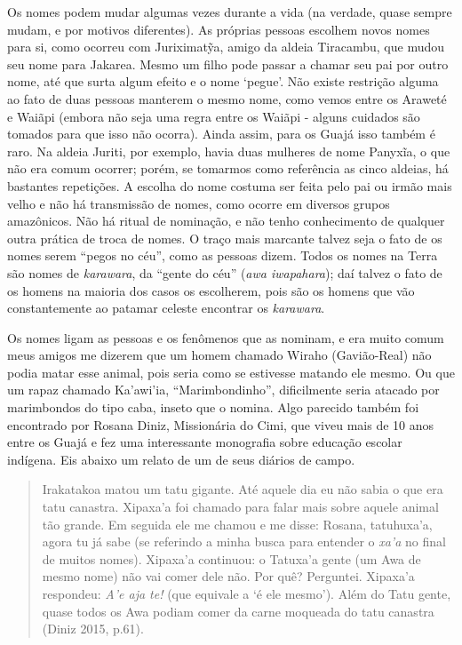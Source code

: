 Os nomes podem mudar algumas vezes durante a vida (na verdade, quase
sempre mudam, e por motivos diferentes). As próprias pessoas escolhem
novos nomes para si, como ocorreu com Juriximatỹa, amigo da aldeia
Tiracambu, que mudou seu nome para Jakarea. Mesmo um filho pode passar a
chamar seu pai por outro nome, até que surta algum efeito e o nome
`pegue'. Não existe restrição alguma ao fato de duas pessoas manterem o
mesmo nome, como vemos entre os Araweté e Waiãpi (embora não seja uma
regra entre os Waiãpi - alguns cuidados são tomados para que isso não
ocorra). Ainda assim, para os Guajá isso também é raro. Na aldeia
Juriti, por exemplo, havia duas mulheres de nome Panyxĩa, o que não era
comum ocorrer; porém, se tomarmos como referência as cinco aldeias, há
bastantes repetições. A escolha do nome costuma ser feita pelo pai ou
irmão mais velho e não há transmissão de nomes, como ocorre em diversos
grupos amazônicos. Não há ritual de nominação, e não tenho conhecimento
de qualquer outra prática de troca de nomes. O traço mais marcante
talvez seja o fato de os nomes serem ``pegos no céu'', como as pessoas
dizem. Todos os nomes na Terra são nomes de \emph{karawara}, da ``gente
do céu'' (\emph{awa iwapahara}); daí talvez o fato de os homens na
maioria dos casos os escolherem, pois são os homens que vão
constantemente ao patamar celeste encontrar os \emph{karawara}.

Os nomes ligam as pessoas e os fenômenos que as nominam, e era muito
comum meus amigos me dizerem que um homem chamado Wiraho (Gavião-Real)
não podia matar esse animal, pois seria como se estivesse matando ele
mesmo. Ou que um rapaz chamado Ka'awi'ia, ``Marimbondinho'',
dificilmente seria atacado por marimbondos do tipo caba, inseto que o
nomina. Algo parecido também foi encontrado por Rosana Diniz,
Missionária do Cimi, que viveu mais de 10 anos entre os Guajá e fez uma
interessante monografia sobre educação escolar indígena. Eis abaixo um
relato de um de seus diários de campo.

\begin{quote}
Irakatakoa matou um tatu gigante. Até aquele dia eu não sabia o que era
tatu canastra. Xipaxa'a foi chamado para falar mais sobre aquele animal
tão grande. Em seguida ele me chamou e me disse: Rosana, tatuhuxa'a,
agora tu já sabe (se referindo a minha busca para entender o \emph{xa'a}
no final de muitos nomes). Xipaxa'a continuou: o Tatuxa'a gente (um Awa
de mesmo nome) não vai comer dele não. Por quê? Perguntei. Xipaxa'a
respondeu: \emph{A'e aja te!} (que equivale a `é ele mesmo'). Além do
Tatu gente, quase todos os Awa podiam comer da carne moqueada do tatu
canastra (Diniz 2015, p.61).
\end{quote}

